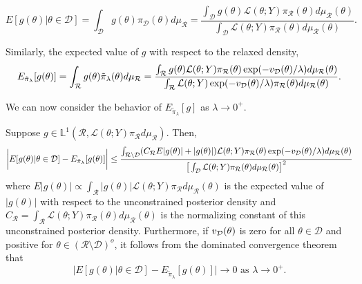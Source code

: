 \documentclass[10pt,fleqn]{article} \pdfoutput=1
\DeclareMathOperator{\1}{\mathbbm{1}} \DeclareMathOperator{\bigO}{\mc O}
\begin{document}
\begin{equation}
	\label{EQ:Expectation_Positive_Measure_Constraint}
	E[g(\theta)|\theta\in\mathcal{D}] = \int_\mathcal{D}
	g(\theta)\pi_\mathcal{D}(\theta)d\mu_\mathcal{R} =
	\frac{\int_\mathcal{D} g(\theta)\mathcal{L}(\theta; Y)
		\pi_\mathcal{R}(\theta)d\mu_\mathcal{R}(\theta)}{\int_\mathcal{D}
		\mathcal{L}(\theta; Y) \pi_\mathcal{R}(\theta)d\mu_\mathcal{R}(\theta)}.
\end{equation} 

Similarly, the expected value of $g$ with respect to the
relaxed density, 
\begin{equation} \label{EQ:Expectation_Positive_Measure_Relaxed}
	E_{\tilde{\pi}_\lambda}[g(\theta)] = \int_\mathcal{R}
	g(\theta)\tilde{\pi}_\lambda(\theta)d\mu_\mathcal{R} =
	\frac{\int_\mathcal{R} g(\theta)\mathcal{L}(\theta; Y)
		\pi_\mathcal{R}(\theta)
		\exp(-v_{\mathcal{D}}(\theta)/\lambda)d\mu_\mathcal{R}(\theta)}{\int_\mathcal{R}
		\mathcal{L}(\theta; Y)\exp(-v_{\mathcal{D}}(\theta)/\lambda)
		\pi_\mathcal{R}(\theta)d\mu_\mathcal{R}(\theta)}.\end{equation}

We can now consider the behavior of $E_{\tilde{\pi}_\lambda}[g]$ as
$\lambda \to 0^+.$

\begin{lemma} \label{THM:positive_measure_approximation_error} Suppose $g
		\in \mathbb{L}^1(\mathcal{R},
		\mathcal{L}(\theta;Y)\pi_\mathcal{R}d\mu_\mathcal{R})$.  Then,
	$$\bigg|E[g(\theta) |\theta\in\mathcal{D}] -
		E_{\tilde{\pi}_\lambda}[g(\theta)]   \bigg| \le
		\frac{\int_{\mathcal{R}\setminus \mathcal{D}}
		(C_\mathcal{R}E|g(\theta)|+|g(\theta)|) \mathcal{L}(\theta; Y)
		\pi_\mathcal{R}(\theta)\exp(-v_{\mathcal{D}}(\theta)/\lambda )
		d\mu_\mathcal{R}(\theta)}{\big[\int_\mathcal{D} \mathcal{L}(\theta; Y)
				\pi_\mathcal{R}(\theta)d\mu_\mathcal{R}(\theta)\big]^2 }$$ where
	$E|g(\theta)| \propto \int_\mathcal{R} |g(\theta)|
		\mathcal{L}(\theta;Y)\pi_\mathcal{R} d\mu_\mathcal{R}(\theta)$ is the
	expected value of $|g(\theta)|$ with respect to the unconstrained posterior
	density and $C_\mathcal{R} = \int_\mathcal{R}
		\mathcal{L}(\theta;Y)\pi_\mathcal{R}(\theta)d\mu_\mathcal{R}(\theta)$ is
	the normalizing constant of this unconstrained posterior density.
	Furthermore, if $v_{\mathcal{D}}(\theta)$ is zero for all $\theta\in\mathcal{D}$ and
	positive for $\theta\in(\mathcal{R}\setminus\mathcal{D})^o$, it follows
	from the dominated convergence theorem that $$\bigg|E[g(\theta)
		|\theta\in\mathcal{D}] - E_{\tilde{\pi}_\lambda}[g(\theta)]   \bigg|\to 0
		\text{ as } \lambda \to 0^+.$$ \end{lemma}
\end{document}
